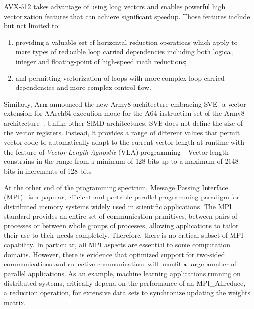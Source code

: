 \documentclass[5p,times,twocolumn]{elsarticle}
\newcommand{\mpi}[0]{\textsc{MPI}\xspace}
\newcommand{\arm}[0]{Arm\xspace}
\newcommand{\sve}[0]{\textsc{SVE}\xspace}
\begin{document}
AVX-512 takes advantage of using long vectors and enables powerful high
vectorization features that can achieve significant speedup. Those features
include but not limited to:
\begin{enumerate}
  \item providing a valuable set of horizontal reduction operations which apply to more
  types of reducible loop carried dependencies including both logical, integer
  and floating-point of high-speed math reductions;
  \item and permitting vectorization of loops with more complex loop carried dependencies and more complex control flow.
\end{enumerate}

Similarly, \arm announced the new Armv8 architecture embracing \sve - a vector extension for AArch64
execution mode for the A64 instruction set of the
Armv8 architecture~\cite{arm-v8-ref, ARMv8-Architecture}.
Unlike other SIMD architectures, \sve does not define the size of
the vector registers. Instead, it provides a range of different values that permit vector
code to automatically adapt to the current vector length at runtime with the
feature of \emph{Vector Length Agnostic} (VLA) programming~\cite{Advanced-SIMD,vla-stencil}.
Vector length constrains in the range from a minimum of 128 bits up to
a maximum of 2048 bits in increments of 128 bits.

At the other end of the programming spectrum, Message Passing Interface
(\mpi)~\cite{mpi-forum} is a popular, efficient and portable parallel programming
paradigm for distributed memory systems widely used in scientific applications.
The MPI standard provides an entire set of communication primitives, between pairs
of processes or between whole groups of processes,
allowing applications to tailor their use to their needs completely.
%
Therefore, there is no critical subset of MPI capability. In particular, all MPI aspects are
essential to some computation domains.
However, there is evidence that optimized support for two-sided communications and
collective communications will benefit a large number of parallel applications. As an example,
machine learning applications running on distributed systems,
critically depend on the performance of an MPI\_Allreduce, a reduction operation,
for extensive data sets to synchronize updating the weights matrix.
\end{document}
